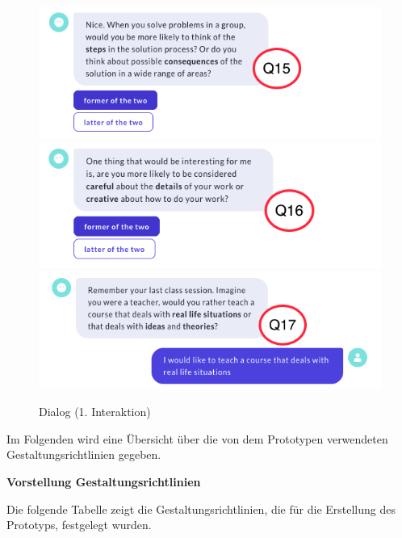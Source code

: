 \begin{figure}[H]
  \centering
  \includegraphics[width=0.7\linewidth]{images/Talk_roterMarker/T15.png}
  \includegraphics[width=0.7\linewidth]{images/Talk_roterMarker/T16.png}
  \includegraphics[width=0.7\linewidth]{images/Talk_roterMarker/T17.png}
  \caption[Dialog (1. Interaktion)]{Dialog (1. Interaktion)}
  \label{fig:GesprächIV}
\end{figure} 
Im Folgenden wird eine Übersicht über die von dem Prototypen verwendeten Gestaltungsrichtlinien gegeben.


\textbf{Vorstellung Gestaltungsrichtlinien}  \label{Gestaltungsrichtlinien}

Die folgende Tabelle zeigt die  Gestaltungsrichtlinien, die für die Erstellung des Prototyps, festgelegt wurden.

